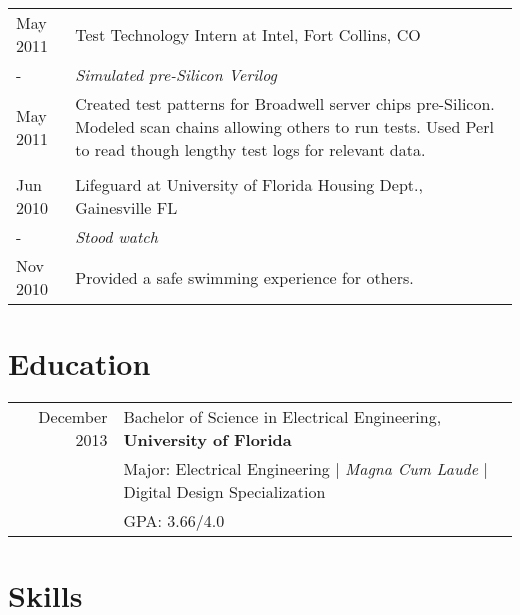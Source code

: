 \documentclass[a4paper,10pt]{article} %
\begin{document}
\begin{tabular}{p{1.6cm}|p{12.4cm}}

\centering May 2011 & Test Technology Intern at Intel, Fort Collins, CO \emph{}\\
\centering - & \emph{Simulated pre-Silicon Verilog}\\
\centering May 2011&\footnotesize{Created test patterns for Broadwell server chips pre-Silicon. Modeled scan chains allowing others to run tests. Used Perl to read though lengthy test logs for relevant data.}\\
\multicolumn{2}{c}{} \\


\centering Jun 2010 & Lifeguard at University of Florida Housing Dept., Gainesville FL \\
\centering - & \emph{Stood watch}\\
\centering Nov 2010& \footnotesize{Provided a safe swimming experience for others.}\\
\end{tabular}


\section{Education}

\begin{tabular}{rl}
December 2013 & Bachelor of Science in Electrical Engineering, \textbf{University of Florida}\\
& \small{Major: Electrical Engineering  | \emph{Magna Cum Laude}  |  Digital Design Specialization}\\
&\normalsize GPA: 3.66/4.0\\


\end{tabular}


\section{Skills}
\end{document}
